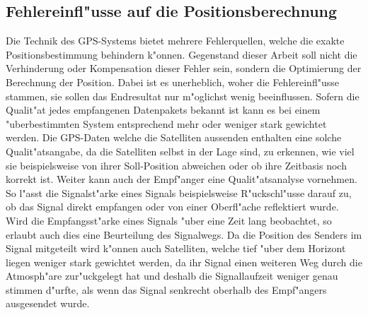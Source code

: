 	\subsection{Fehlereinfl"usse auf die Positionsberechnung}
		Die Technik des GPS-Systems bietet mehrere Fehlerquellen, welche die exakte Positionsbestimmung behindern k"onnen. Gegenstand dieser Arbeit soll nicht die Verhinderung oder Kompensation dieser Fehler sein, sondern die Optimierung der Berechnung der Position. Dabei ist es unerheblich, woher die Fehlereinfl"usse stammen, sie sollen das Endresultat nur m"oglichst wenig beeinflussen. Sofern die Qualit"at jedes empfangenen Datenpakets bekannt ist kann es bei einem "uberbestimmten System entsprechend mehr oder weniger stark gewichtet werden. Die GPS-Daten welche die Satelliten aussenden enthalten eine solche Qualit"atsangabe, da die Satelliten selbst in der Lage sind, zu erkennen, wie viel sie beispielsweise von ihrer Soll-Position abweichen oder ob ihre Zeitbasis noch korrekt ist. Weiter kann auch der Empf"anger eine Qualit"atsanalyse vornehmen. So l"asst die Signalst"arke eines Signals beispielsweise R"uckschl"usse darauf zu, ob das Signal direkt empfangen oder von einer Oberfl"ache reflektiert wurde. Wird die Empfangsst"arke eines Signals "uber eine Zeit lang beobachtet, so erlaubt auch dies eine Beurteilung des Signalwegs. Da die Position des Senders im Signal mitgeteilt wird k"onnen auch Satelliten, welche tief "uber dem Horizont liegen weniger stark gewichtet werden, da ihr Signal einen weiteren Weg durch die Atmosph"are zur"uckgelegt hat und deshalb die Signallaufzeit weniger genau stimmen d"urfte, als wenn das Signal senkrecht oberhalb des Empf"angers ausgesendet wurde. 

